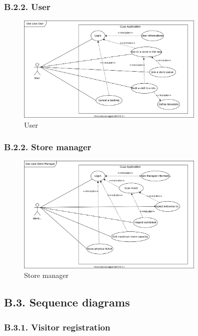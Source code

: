 \subsubsection{B.2.2. User}

\begin{figure}[H]
\centering
\includegraphics[width=0.8\textwidth]{use_cases/use_case_user}
\caption{User}
\end{figure}

\subsubsection{B.2.2. Store manager}

\begin{figure}[H]
\centering
\includegraphics[width=0.8\textwidth]{use_cases/use_case_store_manager}
\caption{Store manager}
\end{figure}

\subsection{B.3. Sequence diagrams}

\subsubsection{B.3.1. Visitor registration}


